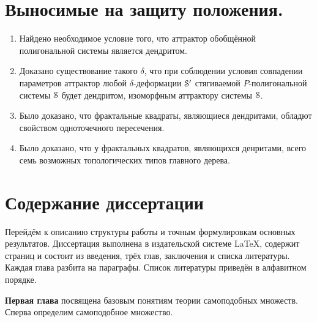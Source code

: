 \section{Выносимые на защиту положения.}


\begin{enumerate}
\item Найдено необходимое условие того, что аттрактор обобщённой полигональной системы является дендритом.

\item Доказано существование такого $\delta$, что при соблюдении условия совпадении параметров аттрактор любой $\delta$-деформации ${\EuScript S}'$ стягиваемой $P$-полигональной системы ${\EuScript S}$ будет дендритом, изоморфным аттрактору системы ${\EuScript S}$.


\item Было доказано, что фрактальные квадраты, являющиеся дендритами, обладют свойством одноточечного пересечения.

\item Было доказано, что у фрактальных квадратов, являющихся денритами, всего семь возможных топологических типов главного дерева.
\end{enumerate}


\section{Содержание диссертации}


Перейдём к описанию структуры работы и точным формулировкам основных результатов.
Диссертация выполнена в издательской системе \LaTeX, содержит \red{\pageref{LastPage}} страниц и состоит из введения, трёх глав, заключения и списка литературы.
Каждая глава разбита на параграфы.
Список литературы приведён в алфавитном порядке.


\textbf{Первая глава} посвящена базовым понятиям теории самоподобных множеств.
Сперва определим самоподобное множество. 

